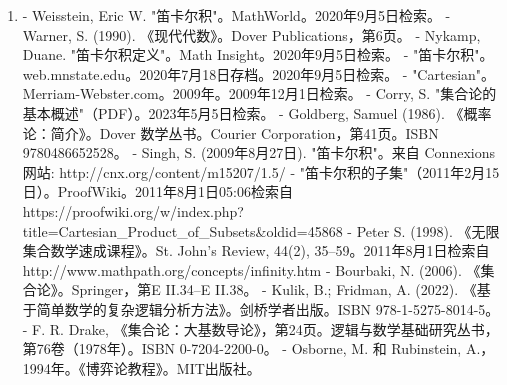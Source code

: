 \begin{enumerate}
\item - Weisstein, Eric W. "笛卡尔积"。MathWorld。2020年9月5日检索。
- Warner, S. (1990). 《现代代数》。Dover Publications，第6页。
- Nykamp, Duane. "笛卡尔积定义"。Math Insight。2020年9月5日检索。
- "笛卡尔积"。web.mnstate.edu。2020年7月18日存档。2020年9月5日检索。
- "Cartesian"。Merriam-Webster.com。2009年。2009年12月1日检索。
- Corry, S. "集合论的基本概述"（PDF）。2023年5月5日检索。
- Goldberg, Samuel (1986). 《概率论：简介》。Dover 数学丛书。Courier Corporation，第41页。ISBN 9780486652528。
- Singh, S. (2009年8月27日). "笛卡尔积"。来自 Connexions 网站: http://cnx.org/content/m15207/1.5/
- "笛卡尔积的子集"（2011年2月15日）。ProofWiki。2011年8月1日05:06检索自 https://proofwiki.org/w/index.php?title=Cartesian_Product_of_Subsets&oldid=45868
- Peter S. (1998). 《无限集合数学速成课程》。St. John's Review, 44(2), 35–59。2011年8月1日检索自 http://www.mathpath.org/concepts/infinity.htm
- Bourbaki, N. (2006). 《集合论》。Springer，第E II.34–E II.38。
- Kulik, B.; Fridman, A. (2022). 《基于简单数学的复杂逻辑分析方法》。剑桥学者出版。ISBN 978-1-5275-8014-5。
- F. R. Drake, 《集合论：大基数导论》，第24页。逻辑与数学基础研究丛书，第76卷（1978年）。ISBN 0-7204-2200-0。
- Osborne, M. 和 Rubinstein, A.，1994年。《博弈论教程》。MIT出版社。
\end{enumerate}
